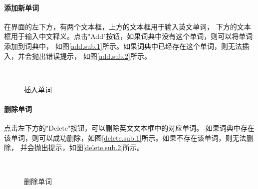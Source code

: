 \documentclass{article}
\begin{document}
\paragraph{添加新单词}在界面的左下方，有两个文本框，上方的文本框用于输入英文单词，
下方的文本框用于输入中文释义。点击"Add"按钮，如果词典中没有这个单词，则可以将单词添加到词典中，
如图\ref{add.sub.1}所示。如果词典中已经存在这个单词，则无法插入，并会抛出错误提示，
如图\ref{add.sub.2}所示。

\begin{figure}[H]
    \centering
    \,    
	\caption{插入单词}
	\label{add.main}
\end{figure}

\paragraph{删除单词} 点击左下方的"Delete"按钮，可以删除英文文本框中的对应单词。
如果词典中存在该单词，则可以成功删除，如图\ref{delete.sub.1}所示。如果不存在该单词，则无法删除，
并会抛出提示，如图\ref{delete.sub.2}所示。

\begin{figure}[H]
    \centering
    \,    
	\caption{删除单词}
	\label{delete.main}
\end{figure}
\end{document}
